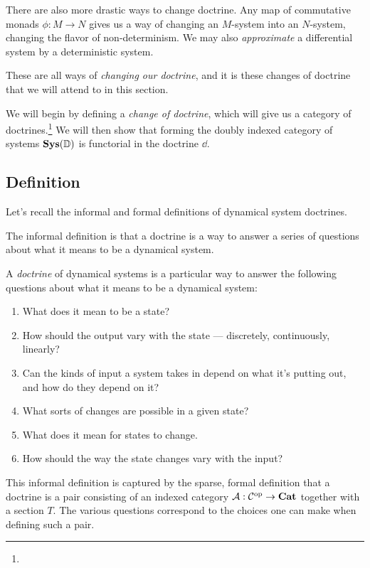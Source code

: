\documentclass[DynamicalBook]{subfiles}
\begin{document}
There are also more drastic ways to change doctrine. Any map of commutative
monads $\phi : M \to N$ gives us a way of changing an $M$-system into an
$N$-system, changing the flavor of non-determinism. We may also
\emph{approximate} a differential system by a deterministic system. 

These are all ways of \emph{changing our doctrine}, and it is these changes of
doctrine that we will attend to in this section. 

We will begin by defining a \emph{change of doctrine}, which will give us a
category of doctrines.\footnote{} We will then show that forming the doubly indexed
category of systems $\textbf{Sys}(\mathbb{D})$ is functorial in the doctrine $\dd$.

\subsection{Definition}

Let's recall the informal and formal definitions of dynamical system doctrines. 

The informal definition is that a doctrine is a way to answer a series of
questions about what it means to be a dynamical system.
\begin{informal}
  A \emph{doctrine} of dynamical systems is a particular way to answer the following
  questions about what it means to be a dynamical system:
  \begin{enumerate}
  \item What does it mean to be a state?
  \item How should the output vary with the state --- discretely,
    continuously, linearly?
  \item Can the kinds of input a
    system takes in depend on what it's putting out, and how do they depend on it?
  \item What sorts of changes are possible in a given state?
  \item What does it mean for states to change. 
  \item How should the way the state changes vary with the input?
  \end{enumerate}
\end{informal}

This informal definition is captured by the sparse, formal definition that a
doctrine is a pair consisting of an indexed category $\mathcal{A} : \mathcal{C}^{\textnormal{op}} \to
\textbf{Cat}$ together with a section $T$. The various questions correspond to the
choices one can make when defining such a pair.
\end{document}
